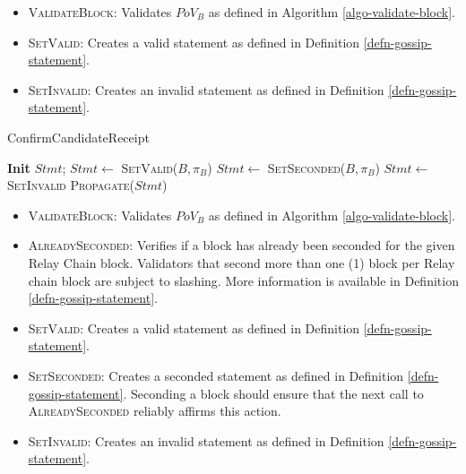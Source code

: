 \begin{itemize}
  \item \textsc{ValidateBlock}: Validates $PoV_B$ as defined in Algorithm
  \ref{algo-validate-block}.
  \item \textsc{SetValid}: Creates a valid statement as defined in Definition
  \ref{defn-gossip-statement}.
  \item \textsc{SetInvalid}: Creates an invalid statement as defined in
  Definition \ref{defn-gossip-statement}.
\end{itemize}

\begin{algorithm}[H]
  \caption[]{\sc ConfirmCandidateReceipt}
  \label{algo-endorse-candidate-receipt}
  \begin{algorithmic}[1]
      \State \textbf{Init} $Stmt$;
          \State $Stmt \leftarrow$ \textsc{SetValid($B, \pi_B$)}
        \Else
          \State $Stmt \leftarrow$ \textsc{SetSeconded($B, \pi_B$)}
        \EndIf
      \Else
        \State $Stmt \leftarrow$ \textsc{SetInvalid}
      \EndIf
      \State \textsc{Propagate}($Stmt$)
  \end{algorithmic}
\end{algorithm}

\begin{itemize}
  \item \textsc{ValidateBlock}: Validates $PoV_B$ as defined in Algorithm
  \ref{algo-validate-block}.
  \item \textsc{AlreadySeconded}: Verifies if a block has already been seconded
  for the given Relay Chain block. Validators that second more than one (1)
  block per Relay chain block are subject to slashing. More information is
  available in Definition \ref{defn-gossip-statement}.
  \item \textsc{SetValid}: Creates a valid statement as defined in Definition
  \ref{defn-gossip-statement}.
  \item \textsc{SetSeconded}: Creates a seconded statement as defined in
  Definition \ref{defn-gossip-statement}. Seconding a block should ensure that
  the next call to \textsc{AlreadySeconded} reliably affirms this action.
  \item \textsc{SetInvalid}: Creates an invalid statement as defined in
  Definition \ref{defn-gossip-statement}.
\end{itemize}


